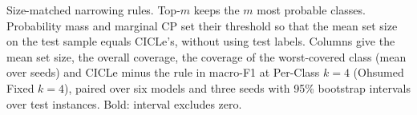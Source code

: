 \begin{table}[t]
  \centering
  \footnotesize
  \setlength{\tabcolsep}{4pt}
  
  \caption{Size-matched narrowing rules. Top-$m$ keeps the $m$ most probable classes. Probability mass and marginal CP set their threshold so that the mean set size on the test sample equals CICLe's, without using test labels. Columns give the mean set size, the overall coverage, the coverage of the worst-covered class (mean over seeds) and CICLe minus the rule in macro-F1 at Per-Class $k = 4$ (Ohsumed Fixed $k = 4$), paired over six models and three seeds with 95\% bootstrap intervals over test instances. Bold: interval excludes zero.}
  \label{tab:matched}
\end{table}
